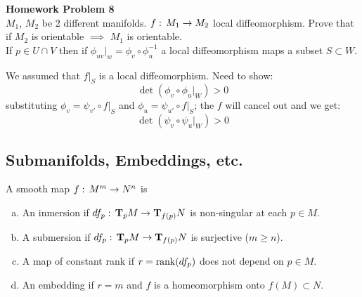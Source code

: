 \textbf{Homework Problem 8}\\
$M_1$, $M_2$ be 2 different manifolds. $f:\, M_1 \to M_2$ local diffeomorphism. Prove that if $M_2$ is orientable $\implies$ $M_1$ is orientable. \\
If $p\in U\cap V$ then if $\phi_{uv}|_w=\phi_v\circ \phi_u ^{-1} $ a local diffeomorphism maps a subset $S\subset W$. 

We assumed that $f|_S$ is a local diffeomorphism. Need to show: 
$$\det\left( \phi_{v}\circ \phi_u |_W \right) >0$$ 
substituting $\phi_v= \psi_{v'}\circ f|_S$ and $\phi_u= \psi_{u'}\circ f|_S$; the $f$ will cancel out and we get:
$$\det \left( \psi_{v}\circ \psi_u |_W \right) >0$$

\subsection{Submanifolds, Embeddings, etc.}
\begin{ddef}
A smooth map $f:\, M^m \to N^n$ is
\begin{enumerate}[a)]
\item An inmersion if $df_p:\, \text{\textbf{T}}_p M \to \text{\textbf{T}}_{f(p)} N$ is non-singular at each $p\in M$.
\item A submersion if  $df_p:\, \text{\textbf{T}}_p M \to \text{\textbf{T}}_{f(p)} N$ is surjective ($m\geq n$).
\item A map of constant rank if $r= \operatorname{rank}(df_p)$ does not depend on $p\in M$.
\item An embedding if $r=m$ and $f$ is a homeomorphism onto $f(M) \subset N$.
\end{enumerate}
\end{ddef}

